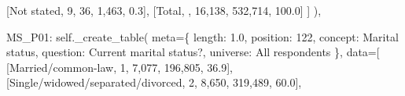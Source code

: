 \documentclass[
  11pt,
  a4paper,
]{article}
\newenvironment{Shaded}{\begin{snugshade}}{\end{snugshade}}
\newcommand{\NormalTok}[1]{\textcolor[rgb]{0.00,0.23,0.31}{#1}}
\newcommand{\OperatorTok}[1]{\textcolor[rgb]{0.37,0.37,0.37}{#1}}
\newcommand{\StringTok}[1]{\textcolor[rgb]{0.13,0.47,0.30}{#1}}
\newcommand{\VariableTok}[1]{\textcolor[rgb]{0.07,0.07,0.07}{#1}}
\begin{document}
\begin{Shaded}
\begin{Highlighting}[]
\NormalTok{                    [}\StringTok{\textquotesingle{}Not stated\textquotesingle{}}\NormalTok{, }\StringTok{\textquotesingle{}9\textquotesingle{}}\NormalTok{, }\StringTok{\textquotesingle{}36\textquotesingle{}}\NormalTok{, }\StringTok{\textquotesingle{}1,463\textquotesingle{}}\NormalTok{, }\StringTok{\textquotesingle{}0.3\textquotesingle{}}\NormalTok{],}
\NormalTok{                    [}\StringTok{\textquotesingle{}Total\textquotesingle{}}\NormalTok{, }\StringTok{\textquotesingle{}\textquotesingle{}}\NormalTok{, }\StringTok{\textquotesingle{}16,138\textquotesingle{}}\NormalTok{, }\StringTok{\textquotesingle{}532,714\textquotesingle{}}\NormalTok{, }\StringTok{\textquotesingle{}100.0\textquotesingle{}}\NormalTok{]}
\NormalTok{                ]}
\NormalTok{            ),}
            
            \StringTok{\textquotesingle{}MS\_P01\textquotesingle{}}\NormalTok{: }\VariableTok{self}\NormalTok{.\_create\_table(}
\NormalTok{                meta}\OperatorTok{=}\NormalTok{\{}
                    \StringTok{\textquotesingle{}length\textquotesingle{}}\NormalTok{: }\StringTok{\textquotesingle{}1.0\textquotesingle{}}\NormalTok{, }\StringTok{\textquotesingle{}position\textquotesingle{}}\NormalTok{: }\StringTok{\textquotesingle{}122\textquotesingle{}}\NormalTok{,}
                    \StringTok{\textquotesingle{}concept\textquotesingle{}}\NormalTok{: }\StringTok{\textquotesingle{}Marital status\textquotesingle{}}\NormalTok{,}
                    \StringTok{\textquotesingle{}question\textquotesingle{}}\NormalTok{: }\StringTok{\textquotesingle{}Current marital status?\textquotesingle{}}\NormalTok{,}
                    \StringTok{\textquotesingle{}universe\textquotesingle{}}\NormalTok{: }\StringTok{\textquotesingle{}All respondents\textquotesingle{}}
\NormalTok{                \},}
\NormalTok{                data}\OperatorTok{=}\NormalTok{[}
\NormalTok{                    [}\StringTok{\textquotesingle{}Married/common{-}law\textquotesingle{}}\NormalTok{, }\StringTok{\textquotesingle{}1\textquotesingle{}}\NormalTok{, }\StringTok{\textquotesingle{}7,077\textquotesingle{}}\NormalTok{, }\StringTok{\textquotesingle{}196,805\textquotesingle{}}\NormalTok{, }\StringTok{\textquotesingle{}36.9\textquotesingle{}}\NormalTok{],}
\NormalTok{                    [}\StringTok{\textquotesingle{}Single/widowed/separated/divorced\textquotesingle{}}\NormalTok{, }\StringTok{\textquotesingle{}2\textquotesingle{}}\NormalTok{, }\StringTok{\textquotesingle{}8,650\textquotesingle{}}\NormalTok{, }\StringTok{\textquotesingle{}319,489\textquotesingle{}}\NormalTok{, }\StringTok{\textquotesingle{}60.0\textquotesingle{}}\NormalTok{],}

\end{Highlighting}
\end{Shaded}
\end{document}
